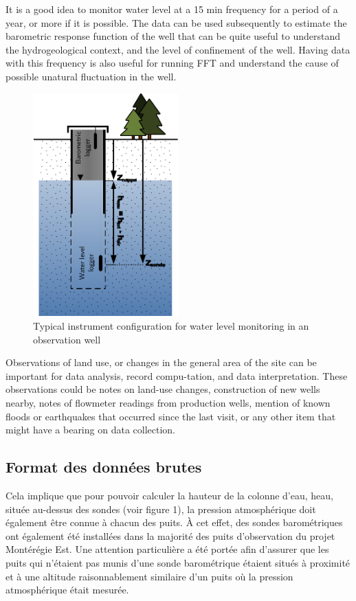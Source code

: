 \documentclass[12pt, letterpaper, fleqn]{report}
\begin{document}
It is a good idea to monitor water level at a 15 min frequency for a period of a year, or more if it is possible. The data can be used subsequently to estimate the barometric response function of the well that can be quite useful to understand the hydrogeological context, and the level of confinement of the well. Having data with this frequency is also useful for running FFT and understand the cause of possible unatural fluctuation in the well.

\begin{figure}[!ht]
\centering
\includegraphics[width=0.5\textwidth]{img/ObsWell}
\caption[Typical instrument configuration for water level monitoring in an observation well]{Typical instrument configuration for water level monitoring in an observation well}
\label{fig:obswell_config}
\end{figure}

Observations of land use, or changes in the general area of the site can be important for data analysis, record compu-tation, and data interpretation. These observations could be notes on land-use changes, construction of new wells nearby, notes of flowmeter readings from production wells, mention of known floods or earthquakes that occurred since the last visit, or any other item that might have a bearing on data collection.


\subsection{Format des données brutes}

Cela implique que pour pouvoir calculer la hauteur de la colonne d'eau, heau, située au-dessus des sondes (voir figure 1), la pression atmosphérique doit également être connue à chacun des puits. À cet effet, des sondes barométriques ont également été installées dans la majorité des puits d'observation du projet Montérégie Est. Une attention particulière a été portée afin d'assurer que les puits qui n'étaient pas munis d'une sonde barométrique étaient situés à proximité et à une altitude raisonnablement similaire d'un puits où la pression atmosphérique était mesurée.
\end{document}
